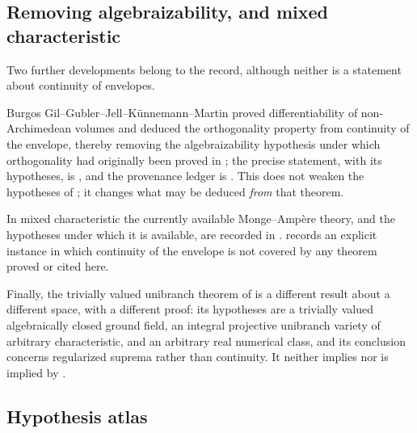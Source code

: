 \subsection{Removing algebraizability, and mixed characteristic}
\label{sec:ch23-later-algebraizability}

Two further developments belong to the record, although neither is a
statement about continuity of envelopes.

Burgos Gil--Gubler--Jell--K\"unnemann--Martin proved differentiability of
non-Archimedean volumes and deduced the orthogonality property from
continuity of the envelope, thereby removing the algebraizability
hypothesis under which orthogonality had originally been proved in
\cite{BFJ15}; the precise statement, with its hypotheses, is
, and the provenance ledger is
.  This does not weaken the hypotheses of
; it changes what may be deduced
\emph{from} that theorem.

In mixed characteristic the currently available Monge--Amp\`ere theory, and
the hypotheses under which it is available, are recorded in
.  
records an explicit instance in which continuity of the envelope is not
covered by any theorem proved or cited here.

Finally, the trivially valued unibranch theorem of
 is a different result about a different
space, with a different proof: its hypotheses are a trivially valued
algebraically closed ground field, an integral projective unibranch variety
of arbitrary characteristic, and an arbitrary real numerical class, and its
conclusion concerns regularized suprema rather than continuity.  It neither
implies nor is implied by .

\subsection{Hypothesis atlas}
\label{sec:ch23-atlas}

